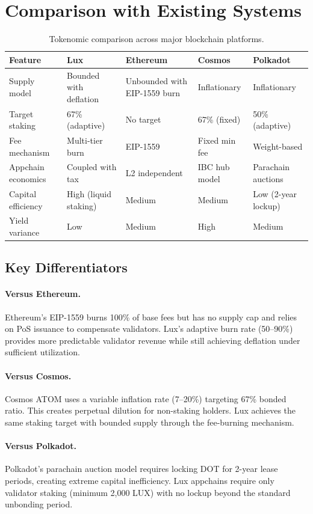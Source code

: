 \section{Comparison with Existing Systems}
\label{sec:comparison}

\begin{table}[H]
\centering
\caption{Tokenomic comparison across major blockchain platforms.}
\label{tab:comparison}
\begin{tabular}{p{3cm}p{2.5cm}p{2.5cm}p{2.5cm}p{2.5cm}}
\toprule
\textbf{Feature} & \textbf{Lux} & \textbf{Ethereum} & \textbf{Cosmos} & \textbf{Polkadot} \\
\midrule
Supply model & Bounded with deflation & Unbounded with EIP-1559 burn & Inflationary & Inflationary \\
Target staking & 67\% (adaptive) & No target & 67\% (fixed) & 50\% (adaptive) \\
Fee mechanism & Multi-tier burn & EIP-1559 & Fixed min fee & Weight-based \\
Appchain economics & Coupled with tax & L2 independent & IBC hub model & Parachain auctions \\
Capital efficiency & High (liquid staking) & Medium & Medium & Low (2-year lockup) \\
Yield variance & Low & Medium & High & Medium \\
\bottomrule
\end{tabular}
\end{table}

\subsection{Key Differentiators}

\paragraph{Versus Ethereum.} Ethereum's EIP-1559 burns 100\% of base fees but has no supply cap and relies on PoS issuance to compensate validators. Lux's adaptive burn rate (50--90\%) provides more predictable validator revenue while still achieving deflation under sufficient utilization.

\paragraph{Versus Cosmos.} Cosmos ATOM uses a variable inflation rate (7--20\%) targeting 67\% bonded ratio. This creates perpetual dilution for non-staking holders. Lux achieves the same staking target with bounded supply through the fee-burning mechanism.

\paragraph{Versus Polkadot.} Polkadot's parachain auction model requires locking DOT for 2-year lease periods, creating extreme capital inefficiency. Lux appchains require only validator staking (minimum 2,000 LUX) with no lockup beyond the standard unbonding period.


